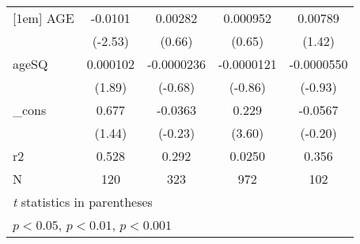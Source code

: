 \begin{table}[htbp]
\begin{tabular}{l*{4}{c}}
[1em]
AGE         &     -0.0101\sym{*}  &     0.00282         &    0.000952         &     0.00789         \\
            &     (-2.53)         &      (0.66)         &      (0.65)         &      (1.42)         \\
[1em]
ageSQ       &    0.000102         &  -0.0000236         &  -0.0000121         &  -0.0000550         \\
            &      (1.89)         &     (-0.68)         &     (-0.86)         &     (-0.93)         \\
[1em]
\_cons      &       0.677         &     -0.0363         &       0.229\sym{***}&     -0.0567         \\
            &      (1.44)         &     (-0.23)         &      (3.60)         &     (-0.20)         \\
\hline
r2          &       0.528         &       0.292         &      0.0250         &       0.356         \\
N           &         120         &         323         &         972         &         102         \\
\hline\hline
\multicolumn{5}{l}{\footnotesize \textit{t} statistics in parentheses}\\
\multicolumn{5}{l}{\footnotesize \sym{*} \(p<0.05\), \sym{**} \(p<0.01\), \sym{***} \(p<0.001\)}\\
\end{tabular}
\end{table}
